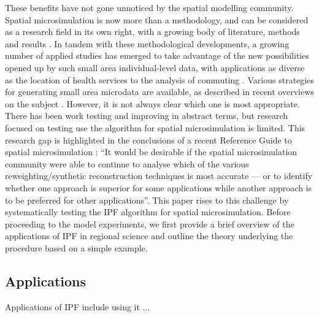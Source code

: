 \documentclass[a4paper,10pt]{article}
\begin{document}
These benefits have not gone unnoticed by the spatial modelling community.
Spatial microsimulation is now more than a methodology, and
can be considered as a research field in its
own right, with a growing body of literature, methods and results \citep{Tanton2013}.
In tandem with these methodological developments, a growing number of applied studies
has emerged to take advantage of the new possibilities opened up by such small area individual-level data,
with applications as diverse as the location of health services \citep{Tomintz2008} to the
analysis of commuting \citep{Lovelace2014-jtg}.
Various strategies for generating small area microdata are available,
as described in recent overviews on the subject \citep{Tanton2013, Ballas2013-4policy-analysis, Hermes2012a}.
However, it is not always clear which one is most appropriate.
There has been work testing
 and improving \citep{teh2003improving} 
in abstract terms, but research focused on testing use the algorithm for spatial microsimulation is limited.
This research gap is highlighted in the conclusions of a recent Reference Guide to spatial microsimulation
\citep[p~270]{Clarke2013-concs}:
``It would be desirable if the spatial microsimulation community were able to continue to
analyse which of the various reweighting/synthetic reconstruction techniques is most accurate
--- or to identify whether one approach is superior for some applications while another
approach is to be preferred for other applications''.
This paper rises to this challenge by systematically testing the IPF algorithm for spatial microsimulation.
Before proceeding to the model experiments, we first
provide a brief overview of the applications of IPF in regional science
and outline the theory underlying the procedure based on a simple example. 

\subsection{Applications}
Applications of IPF include using it ...
\end{document}
